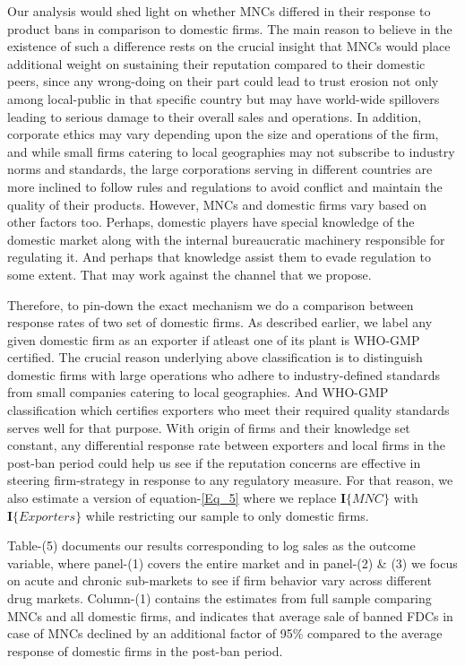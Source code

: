 \documentclass[AER]{AEA}
\theoremstyle{theorem}
\begin{document}
Our analysis would shed light on whether MNCs differed in their response to product bans in comparison to domestic firms. The main reason to believe in the existence of such a difference rests on the crucial insight that MNCs would place additional weight on sustaining their reputation compared to their domestic peers, since any wrong-doing on their part could lead to trust erosion not only among local-public in that specific country but may have world-wide spillovers leading to serious damage to their overall sales and operations. In addition, corporate ethics may vary depending upon the size and operations of the firm, and while small firms catering to local geographies may not subscribe to industry norms and standards, the large corporations serving in different countries are more inclined to follow rules and regulations to avoid conflict and maintain the quality of their products. However, MNCs and domestic firms vary based on other factors too. Perhaps, domestic players have special knowledge of the domestic market along with the internal bureaucratic machinery responsible for regulating it. And perhaps that knowledge assist them to evade regulation to some extent. That may work against the channel that we propose.

Therefore, to pin-down the exact mechanism we do a comparison between response rates of two set of domestic firms. As described earlier, we label any given domestic firm as an exporter if atleast one of its plant is WHO-GMP certified. The crucial reason underlying above classification is to distinguish domestic firms with large operations  who adhere to industry-defined standards from small companies catering to local geographies. And WHO-GMP classification which certifies exporters who meet their required quality standards serves well for that purpose. With origin of firms and their knowledge set constant, any differential response rate  between exporters and local firms in the post-ban period could help us see if the reputation concerns are effective in steering firm-strategy in response to any regulatory measure. For that reason, we also estimate a version of equation-\ref{Eq_5} where we replace $\mathbf{I}\{MNC\}$ with $\mathbf{I}\{Exporters\}$ while restricting our sample to only domestic firms.

Table-(5) documents our results corresponding to log sales as the outcome variable, where panel-(1) covers the entire market and in panel-(2) \& (3) we focus on acute and chronic sub-markets to see if firm behavior vary across different drug markets. Column-(1) contains the estimates from full sample comparing MNCs and all domestic firms, and indicates that average sale of banned FDCs in case of MNCs declined by an additional factor of 95\% compared to the average response of domestic firms in the post-ban period.
\end{document}
